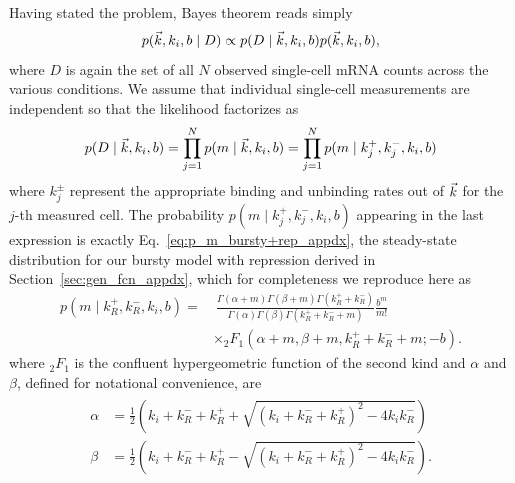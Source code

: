 Having stated the problem, Bayes theorem reads simply
\begin{equation}
p(\vec{k}, k_i, b \mid D)
\propto
p(D \mid\vec{k}, k_i, b) p(\vec{k}, k_i, b),
\end{equation}
where $D$ is again the set of all $N$ observed single-cell mRNA counts
across the various conditions. We assume that individual single-cell
measurements are independent so that the likelihood factorizes as
\begin{equation}
p(D \mid\vec{k}, k_i, b)
= \prod_{j=1}^N p(m\mid \vec{k}, k_i, b)
= \prod_{j=1}^N p(m\mid k_j^+, k_j^-, k_i, b)
\end{equation}
where $k_j^\pm$ represent the appropriate binding and unbinding
rates out of $\vec{k}$ for the $j$-th measured cell. The probability
$p(m\mid k_j^+, k_j^-, k_i, b)$ appearing in the last expression
is exactly Eq.~\ref{eq:p_m_bursty+rep_appdx}, the steady-state
distribution for our bursty model with repression derived in
Section~\ref{sec:gen_fcn_appdx}, which for completeness we reproduce here as
\begin{equation}
\begin{split}
p(m \mid k_R^+, k_R^-, k_i, b) = & ~\frac{
        \Gamma(\alpha + m)\Gamma(\beta + m)\Gamma(k_R^+ + k_R^-)
        }
        {
        \Gamma(\alpha)\Gamma(\beta)\Gamma(k_R^+ + k_R^- + m)
        }
\frac{b^m}{m!}
\\
&\times {_2F_1}(\alpha+m, \beta+m, k_R^++k_R^-+m; -b).
\end{split}
\label{eq:p_m_bursty+rep}
\end{equation}
where $_2F_1$ is the confluent hypergeometric function of the second kind and
$\alpha$ and $\beta$, defined for notational convenience, are
\begin{align}
\begin{split}
\alpha &= \frac{1}{2}
\left(k_i+k_R^-+k_R^+ + \sqrt{(k_i+k_R^-+k_R^+)^2 - 4k_i k_R^-}\right)
\\
\beta &= \frac{1}{2}
\left(k_i+k_R^-+k_R^+ - \sqrt{(k_i+k_R^-+k_R^+)^2 - 4k_i k_R^-}\right).
\end{split}
\end{align}

